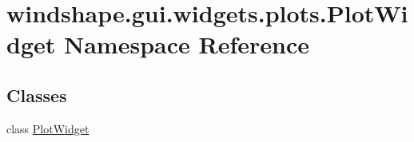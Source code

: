 \hypertarget{namespacewindshape_1_1gui_1_1widgets_1_1plots_1_1_plot_widget}{}\section{windshape.\+gui.\+widgets.\+plots.\+Plot\+Widget Namespace Reference}
\label{namespacewindshape_1_1gui_1_1widgets_1_1plots_1_1_plot_widget}
\subsection*{Classes}
\begin{DoxyCompactItemize}
\item 
class \mbox{\hyperlink{classwindshape_1_1gui_1_1widgets_1_1plots_1_1_plot_widget_1_1_plot_widget}{Plot\+Widget}}
\end{DoxyCompactItemize}
